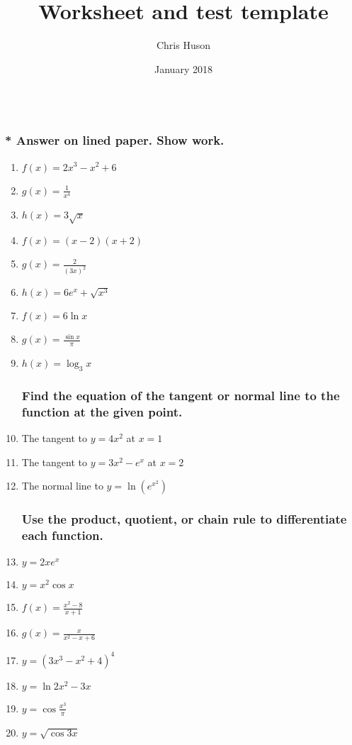 \documentclass[12pt, oneside]{article}
\title{Worksheet and test template}
\author{Chris Huson}
\date{January 2018}
\begin{document}
\subsubsection*{\\* Answer on lined paper. Show work.}

\begin{enumerate}

\vspace{0.5 cm}

\subsubsection*{Differentiate each function.}

\item $f(x)=2x^3-x^2+6$
\item $g(x) = \frac{1}{x^4}$
\item $h(x)= 3\sqrt{x}$
\item $f(x)=(x-2)(x+2)$
\item $g(x)=\frac{2}{(3x)^2}$
\item $h(x)=6e^x+\sqrt{x^3}$
\item $f(x)=6\ln{x}$
\item $g(x) = \displaystyle \frac{\sin x}{\pi}$
\item $h(x)= \log_3{x}$

\subsubsection*{Find the equation of the tangent or normal line to the function at the given point.}

\item The tangent to $y=4x^2$ at $x=1$
\item The tangent to $y=3x^2-e^x$ at $x=2$
\item The normal line to $\displaystyle y=\ln(e^{x^2})$

\subsubsection*{Use the product, quotient, or chain rule to differentiate each function.}

\item $y=2xe^x$
\item $y= x^2\cos{x}$
\item $f(x)= \displaystyle \frac{x^2-8}{x+1}$
\item $g(x) =\displaystyle \frac{x}{x^2-x+6}$
\item $y = (3x^3-x^2+4)^4$
\item $y= \ln{2x^2-3x}$
\item $y= \displaystyle \cos{\frac{x^3}{\pi}}$
\item $y = \sqrt{\cos{3x}}$


\end{enumerate}
\end{document}
